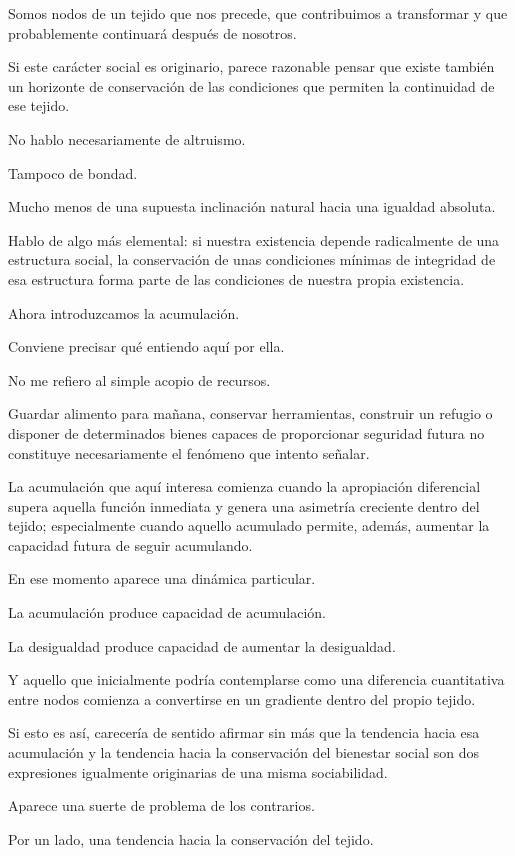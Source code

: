 \documentclass[12pt,a4paper]{article}
\begin{document}
Somos nodos de un tejido que nos precede, que contribuimos a transformar y que probablemente continuará después de nosotros.

Si este carácter social es originario, parece razonable pensar que existe también un horizonte de conservación de las condiciones que permiten la continuidad de ese tejido.

No hablo necesariamente de altruismo.

Tampoco de bondad.

Mucho menos de una supuesta inclinación natural hacia una igualdad absoluta.

Hablo de algo más elemental: si nuestra existencia depende radicalmente de una estructura social, la conservación de unas condiciones mínimas de integridad de esa estructura forma parte de las condiciones de nuestra propia existencia.

Ahora introduzcamos la acumulación.

Conviene precisar qué entiendo aquí por ella.

No me refiero al simple acopio de recursos.

Guardar alimento para mañana, conservar herramientas, construir un refugio o disponer de determinados bienes capaces de proporcionar seguridad futura no constituye necesariamente el fenómeno que intento señalar.

La acumulación que aquí interesa comienza cuando la apropiación diferencial supera aquella función inmediata y genera una asimetría creciente dentro del tejido; especialmente cuando aquello acumulado permite, además, aumentar la capacidad futura de seguir acumulando.

En ese momento aparece una dinámica particular.

La acumulación produce capacidad de acumulación.

La desigualdad produce capacidad de aumentar la desigualdad.

Y aquello que inicialmente podría contemplarse como una diferencia cuantitativa entre nodos comienza a convertirse en un gradiente dentro del propio tejido.

Si esto es así, carecería de sentido afirmar sin más que la tendencia hacia esa acumulación y la tendencia hacia la conservación del bienestar social son dos expresiones igualmente originarias de una misma sociabilidad.

Aparece una suerte de problema de los contrarios.

Por un lado, una tendencia hacia la conservación del tejido.
\end{document}
